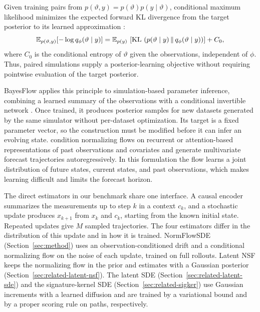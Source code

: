 Given training pairs from $p(\vartheta,y)=p(\vartheta)p(y\mid\vartheta)$, conditional maximum likelihood minimizes the expected forward KL divergence from the target posterior to its learned approximation \citep{radev2020bayesflow}:
\begin{equation}\label{eq:amortized-forward-kl}
 \mathbb E_{p(\vartheta,y)}[-\log q_\phi(\vartheta\mid y)]
 =\mathbb E_{p(y)}\,\left[\operatorname{KL}\,\left(p(\vartheta\mid y)\,\Vert\,q_\phi(\vartheta\mid y)\right)\right]+C_0,
\end{equation}
where $C_0$ is the conditional entropy of $\vartheta$ given the observations, independent of $\phi$. Thus, paired simulations supply a posterior-learning objective without requiring pointwise evaluation of the target posterior. 

BayesFlow applies this principle to simulation-based parameter inference, combining a learned summary of the observations with a conditional invertible network \citep{radev2020bayesflow}. Once trained, it produces posterior samples for new datasets generated by the same simulator without per-dataset optimization. Its target is a fixed parameter vector, so the construction must be modified before it can infer an evolving state. \citet{rasul2021conditionedflows} condition normalizing flows on recurrent or attention-based representations of past observations and covariates and generate multivariate forecast trajectories autoregressively. In this formulation the flow learns a joint distribution of future states, current states, and past observations, which makes learning difficult and limits the forecast horizon.

The direct estimators in our benchmark share one interface. A causal encoder summarizes the measurements up to step $k$ in a context $c_k$, and a stochastic update produces $x_{k+1}$ from $x_k$ and $c_k$, starting from the known initial state. Repeated updates give $M$ sampled trajectories. The four estimators differ in the distribution of this update and in how it is trained. NormFlowSDE (Section~\ref{sec:method}) uses an observation-conditioned drift and a conditional normalizing flow on the noise of each update, trained on full rollouts. Latent NSF keeps the normalizing flow in the prior and estimates with a Gaussian posterior (Section~\ref{sec:related-latent-nsf}). The latent SDE (Section~\ref{sec:related-latent-sde}) and the signature-kernel SDE (Section~\ref{sec:related-sigker}) use Gaussian increments with a learned diffusion and are trained by a variational bound and by a proper scoring rule on paths, respectively.

